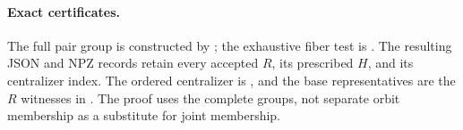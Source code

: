 \paragraph{Exact certificates.}
The full pair group is constructed by
; the exhaustive
fiber test is
.
The resulting JSON and NPZ records retain every accepted
$R$, its prescribed $H$, and its centralizer index.
The ordered centralizer is
,
and the base representatives are the $R$ witnesses in
.
The proof uses the complete groups, not separate orbit
membership as a substitute for joint membership.
